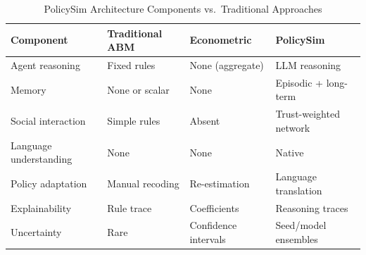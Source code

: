 \documentclass[conference]{IEEEtran}
\begin{document}
\begin{table}[!t]
\caption{PolicySim Architecture Components vs.\ Traditional Approaches}
\label{tab:archcompare}
\centering
\renewcommand{\arraystretch}{1.25}
\footnotesize
\begin{tabular}{@{}p{1.6cm}p{1.55cm}p{1.5cm}p{1.7cm}@{}}
\toprule
\textbf{Component} & \textbf{Traditional ABM} & \textbf{Econometric} & \textbf{PolicySim} \\
\midrule
Agent reasoning & Fixed rules & None (aggregate) & LLM reasoning \\
Memory & None or scalar & None & Episodic + long-term \\
Social interaction & Simple rules & Absent & Trust-weighted network \\
Language understanding & None & None & Native \\
Policy adaptation & Manual recoding & Re-estimation & Language translation \\
Explainability & Rule trace & Coefficients & Reasoning traces \\
Uncertainty & Rare & Confidence intervals & Seed/model ensembles \\
\bottomrule
\end{tabular}
\end{table}
\end{document}
